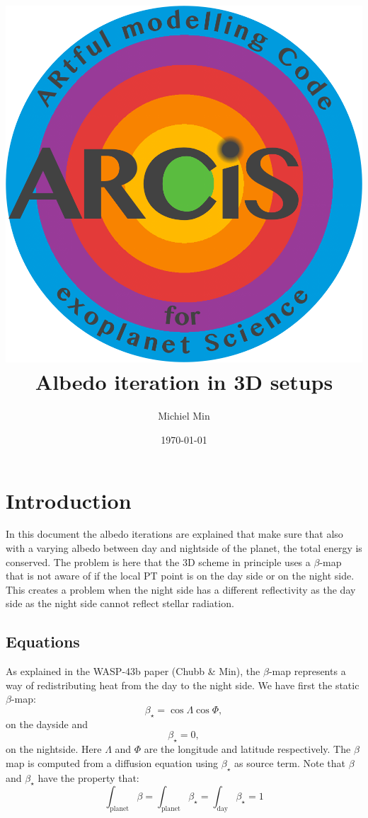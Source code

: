 \documentclass[12pt]{article}
\begin{document}
\title{\includegraphics[width=0.9\hsize]{ARCiS}\\Albedo iteration in 3D setups}
\author{Michiel Min}
\date{\today}
\maketitle

\section{Introduction}

In this document the albedo iterations are explained that make sure that also with a varying albedo between day and nightside of the planet, the total energy is conserved. The problem is here that the 3D scheme in principle uses a $\beta$-map that is not aware of if the local PT point is on the day side or on the night side. This creates a problem when the night side has a different reflectivity as the day side as the night side cannot reflect stellar radiation.

\subsection{Equations}

As explained in the WASP-43b paper (Chubb \& Min), the $\beta$-map represents a way of redistributing heat from the day to the night side. We have first the static $\beta$-map:
\begin{equation}
\beta_\star=\cos\Lambda\cos\Phi,
\end{equation}
on the dayside and
\begin{equation}
\beta_\star=0,
\end{equation}
on the nightside. Here $\Lambda$ and $\Phi$ are the longitude and latitude respectively.
The $\beta$ map is computed from a diffusion equation using $\beta_\star$ as source term. Note that $\beta$ and $\beta_\star$ have the property that:
\begin{equation}
\label{eq:normalise}
\int_\mathrm{planet}\beta=\int_\mathrm{planet}\beta_\star=\int_\mathrm{day}\beta_\star=1
\end{equation}
\end{document}
